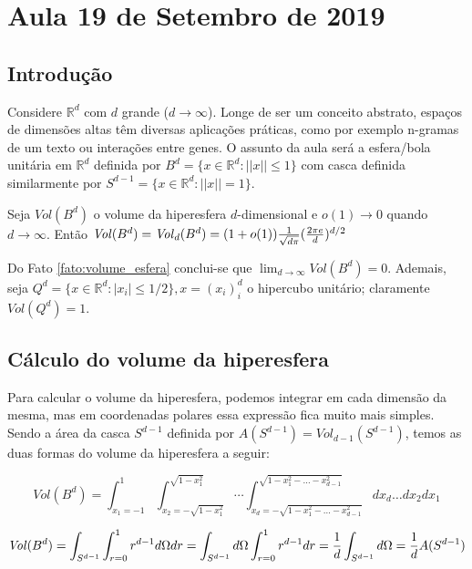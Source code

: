 \section{Aula 19 de Setembro de 2019}
\label{2019_09_19}

\subsection{Introdução}

Considere $\mathbb{R}^d$ com $d$ grande ($d \to \infty$). Longe de ser um conceito abstrato, espaços de dimensões altas têm diversas aplicações práticas, como por exemplo n-gramas de um texto ou interações entre genes. O assunto da aula \cite{blum2016foundations} será a esfera/bola unitária em $\mathbb{R}^d$ definida por $B^d = \{x \in \mathbb{R}^d: ||x|| \leqslant 1\}$ com casca definida similarmente por $S^{d-1} = \{x \in \mathbb{R}^d: ||x|| = 1\}$.

\begin{fato}
\label{fato:volume_esfera}
Seja $\mathit{Vol}(B^d)$ o volume da hiperesfera $d$-dimensional e $o(1) \to 0$ quando $d \to \infty$. Então $\mathit{Vol}(B^d) = \mathit{Vol}_d(B^d) = (1 + o(1)) {1 \over \sqrt{d\pi}} ({2 \pi e \over d})^{d/2}$
\end{fato}

Do Fato \ref{fato:volume_esfera} conclui-se que $\lim_{d \to \infty} \mathit{Vol}(B^d) = 0$. Ademais, seja $Q^d = \{x \in \mathbb{R}^d: |x_i| \leqslant 1/2\}, x = (x_i)_i^d$ o hipercubo unitário; claramente $\mathit{Vol}(Q^d) = 1$.

\subsection{Cálculo do volume da hiperesfera}

Para calcular o volume da hiperesfera, podemos integrar em cada dimensão da mesma, mas em coordenadas polares essa expressão fica muito mais simples. Sendo a área da casca $S^{d-1}$ definida por $A(S^{d-1}) = \mathit{Vol}_{d-1}(S^{d-1})$, temos as duas formas do volume da hiperesfera a seguir:

$$\mathit{Vol}(B^d) = \int_{x_1  = -1}^1 \int_{x_2 = -\sqrt{1-x_1^2}}^{\sqrt{1-x_1^2}} \cdots \int_{x_d = -\sqrt{1 - x_1^2 - \dots - x_{d-1}^2}}^{\sqrt{1 - x_1^2 - \dots - x_{d-1}^2}} dx_d \dots dx_2 dx_1$$

$$\mathit{Vol}(B^d) = \int_{S^{d-1}} \int_{r = 0}^1 r^{d-1} d\Omega dr = \int_{S^{d-1}} d\Omega \int_{r = 0}^1 r^{d-1} dr = {1\over d} \int_{S^{d-1}} d\Omega = {1\over d} A(S^{d-1})$$

